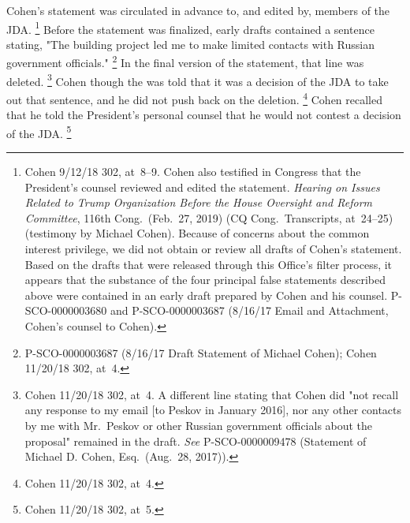 {Cohen's statement was circulated in advance to, and edited by, members of the JDA\null.%
\footnote{Cohen 9/12/18 302, at~8--9.
Cohen also testified in Congress that the President's counsel reviewed and edited the statement.
\textit{Hearing on Issues Related to Trump Organization Before the House Oversight and Reform Committee}, 116th Cong.\ (Feb.~27, 2019) (CQ Cong.\ Transcripts, at~24--25) (testimony by Michael Cohen).
Because of concerns about the common interest privilege, we did not obtain or review all drafts of Cohen's statement.
Based on the drafts that were released through this Office's filter process, it appears that the substance of the four principal false statements described above were contained in an early draft prepared by Cohen and his counsel.
P-SCO-0000003680 and P-SCO-0000003687 (8/16/17 Email and Attachment, Cohen's counsel to Cohen).}
Before the statement was finalized, early drafts contained a sentence stating, "The building project led me to make limited contacts with Russian government officials."%
\footnote{P-SCO-0000003687 (8/16/17 Draft Statement of Michael Cohen);
Cohen 11/20/18 302, at~4.}
In the final version of the statement, that line was deleted.%
\footnote{Cohen 11/20/18 302, at~4.
A different line stating that Cohen did "not recall any response to my email [to Peskov in January 2016], nor any other contacts by me with Mr.~Peskov or other Russian government officials about the proposal" remained in the draft.
\textit{See} P-SCO-0000009478 (Statement of Michael D. Cohen, Esq.\ (Aug.~28, 2017)).}
Cohen though the was told that it was a decision of the JDA to take out that sentence, and he did not push back on the deletion.%
\footnote{Cohen 11/20/18 302, at~4.}
Cohen recalled that he told the President's personal counsel that he would not contest a decision of the JDA\null.%
\footnote{Cohen 11/20/18 302, at~5.}

}
